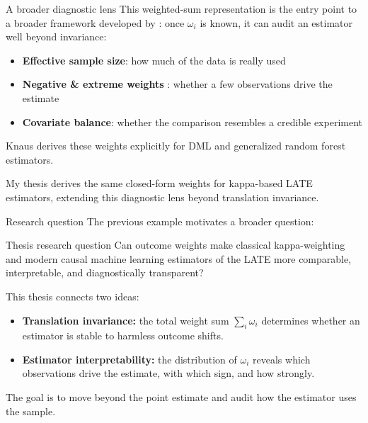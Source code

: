 \documentclass[11pt]{beamer}
\begin{document}
\begin{frame}{A broader diagnostic lens}
This weighted-sum representation is the entry point to a broader framework developed by \citet{knaus2024treatment}: once $\omega_i$ is known, it can audit an estimator well beyond invariance:

\begin{itemize}
\item \textbf{Effective sample size}: how much of the data is really used
\item \textbf{Negative \& extreme weights} : whether a few observations drive the estimate
\item \textbf{Covariate balance}: whether the comparison resembles a credible experiment
\end{itemize}

\vspace{0.25cm}
Knaus derives these weights explicitly for DML and generalized random forest estimators.

\vspace{0.2cm}
\centering
\alert{My thesis derives the same closed-form weights for kappa-based LATE estimators, extending this diagnostic lens beyond translation invariance.}
\end{frame}


\begin{frame}{Research question}
The previous example motivates a broader question:

\vspace{0.2cm}
\begin{block}{Thesis research question}
Can outcome weights make classical kappa-weighting and modern causal machine learning estimators of the LATE more comparable, interpretable, and diagnostically transparent?
\end{block}

\vspace{0.25cm}
This thesis connects two ideas:

\begin{itemize}
\item \textbf{Translation invariance:} the total weight sum $\sum_i \omega_i$ determines whether an estimator is stable to harmless outcome shifts.
\item \textbf{Estimator interpretability:} the distribution of $\omega_i$ reveals which observations drive the estimate, with which sign, and how strongly.
\end{itemize}



\vspace{0.2cm}
\centering
\alert{The goal is to move beyond the point estimate and audit how the estimator uses the sample.}
\end{frame}
\end{document}
